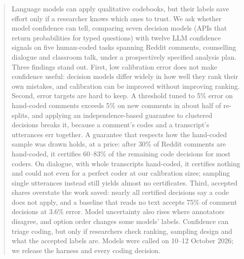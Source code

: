 \begin{abstract}
Language models can apply qualitative codebooks, but their labels save effort only if a researcher knows which ones to trust.
We ask whether model confidence can tell, comparing seven decision models (APIs that return probabilities for typed
questions) with twelve LLM confidence signals on five human-coded tasks spanning Reddit comments, counselling dialogue and
classroom talk, under a prospectively specified analysis plan. Three findings stand out. First, low calibration error does
not make confidence useful: decision models differ widely in how well they rank their own mistakes, and calibration can be
improved without improving ranking. Second, error targets are hard to keep. A threshold tuned to 5\% error on hand-coded
comments exceeds 5\% on new comments in about half of re-splits, and applying an independence-based guarantee to clustered
decisions breaks it, because a comment's codes and a transcript's utterances err together. A guarantee that respects how the
hand-coded sample was drawn holds, at a price: after 30\% of Reddit comments are hand-coded, it certifies 60--83\% of the
remaining code decisions for most coders. On dialogue, with whole transcripts hand-coded, it certifies nothing and could not
even for a perfect coder at our calibration sizes; sampling single utterances instead still yields almost no certificates.
Third, accepted shares overstate the work saved: nearly all certified decisions say a code does not apply, and a baseline
that reads no text accepts 75\% of comment decisions at 3.6\% error. Model uncertainty also rises where annotators disagree,
and option order changes some models' labels. Confidence can triage coding, but only if researchers check ranking, sampling
design and what the accepted labels are. Models were called on 10--12 October 2026; we release the harness and every coding
decision.
\end{abstract}
